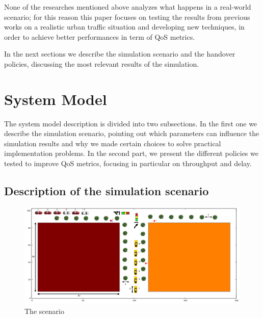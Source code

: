 \documentclass[conference,10pt]{IEEEtran}
\begin{document}
None of the researches mentioned above analyzes what happens in a real-world scenario; for this reason this paper focuses on testing the results from previous works on a realistic urban traffic situation and developing new techniques, in order to achieve better performances in term of QoS metrics.

In the next sections we describe the simulation scenario and the handover policies, discussing the most relevant results of the simulation.


\section{System Model}\label{sec:symo}
The system model description is divided into two subsections. In the first one we describe the simulation scenario, pointing out which parameters can influence the simulation results and why we made certain choices to solve practical implementation problems.
In the second part, we present the different policies we tested to improve QoS metrics, focusing in particular on throughput and delay.

\subsection{Description of the simulation scenario}

\begin{figure}[ht]
	\begin{center}    
		\includegraphics[width=14cm, keepaspectratio]{images/scenario3.png}
		\caption{The scenario}
		\label{fig:scenario}
	\end{center}
\end{figure}
\end{document}
